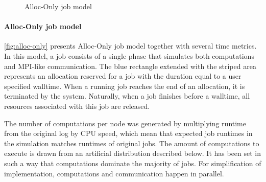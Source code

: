 \documentclass[thesis-en.tex]{subfiles}
\begin{document}
\begin{figure}[htb]
\centering
{}
\caption{Alloc-Only job model}
\label{fig:alloc-only}
\end{figure}

\paragraph{Alloc-Only job model}
\autoref{fig:alloc-only} presents Alloc-Only job model together with several time metrics. In this model, a job consists of a single phase that simulates both computations and MPI-like communication. The blue rectangle extended with the striped area represents an allocation reserved for a job with the duration equal to a user specified walltime. When a running job reaches the end of an allocation, it is terminated by the system. Naturally, when a job finishes before a walltime, all resources associated with this job are released.

The number of computations per node was generated by multiplying runtime from the original log by CPU speed, which mean that expected job runtimes in the simulation matches runtimes of original jobs. The amount of computations to execute is drawn from an artificial distribution described below. It has been set in such a way that computations dominate the majority of jobs. For simplification of implementation, computations and communication happen in parallel.
\end{document}
